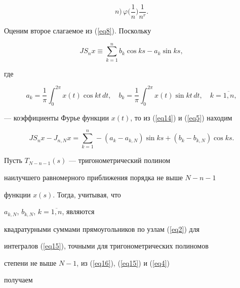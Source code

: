 \begin{pf}
\begin{equation}
n\bigg)\,\varphi\bigg(\frac{1}{n}\bigg)\frac{1}{n^r}.


\end{equation}





Оценим второе слагаемое из (\ref{eq8}). Поскольку


\begin{equation}\label{eq14}


JS_nx\equiv\sum_{k=1}^nb_k\cos ks-a_k\sin ks,


\end{equation}


где


\begin{equation}\label{eq15}


a_k=\frac{1}{\pi}\int_0^{2\pi}x(t)\cos


kt\,dt,\quad


b_k=\frac{1}{\pi}\int_0^{2\pi}x(t)\sin


kt\,dt,\quad k=\overline{1,n},


\end{equation}


--- коэффициенты Фурье функции $x(t)$, то из (\ref{eq14}) и (\ref{eq5}) находим


\begin{equation}\label{eq16}


JS_nx-J_{n,N}x=\sum_{k=1}^n-(a_k-a_{k,N})\sin


ks+(b_k-b_{k,N})\cos ks.


\end{equation}





Пусть $T_{N-n-1}(s)$ --- тригонометрический полином


наилучшего равномерного приближения порядка не выше $N-n-1$


функции $x(s)$. Тогда, учитывая, что


$a_{k,N}$, $b_{k,N}$, $k=\overline{1,n}$, являются


квадратурными суммами прямоугольников по узлам (\ref{eq2}) для


интегралов (\ref{eq15}), точными для тригонометрических полиномов


степени не выше $N-1$, из (\ref{eq16}), (\ref{eq15}) и (\ref{eq4})


получаем


\begin{gather}



\end{gather}
\end{pf}
